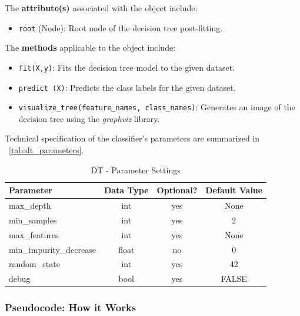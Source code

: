 \begin{appendices}
  The \textbf{attribute(s)} associated with the object include:
  \begin{itemize}
    \item \texttt{root} (Node): Root node of the decision tree post-fitting.
  \end{itemize}

  The \textbf{methods} applicable to the object include:
  \begin{itemize}
    \item \texttt{fit(X,y)}: Fits the decision tree model to the given dataset.
    \item \texttt{predict (X)}: Predicts the class labels for the given dataset.
    \item \texttt{visualize\_tree(feature\_names, class\_names)}: Generates an image of the decision tree using the \textit{graphviz} library.
  \end{itemize}

  Technical specification of the classifier's parameters are summarized in ~\autoref{tab:dt_parameters}.

  \begin{table}[H]
    \centering
    \begin{tabular}{lccc}
      \toprule
      \textbf{Parameter}      & \textbf{Data Type} & \textbf{Optional?} & \textbf{Default Value} \\
      \midrule
      max\_depth              & int                & yes                & None                   \\
      min\_samples            & int                & yes                & 2                      \\
      max\_features           & int                & yes                & None                   \\
      min\_impurity\_decrease & float              & no                 & 0                      \\
      random\_state           & int                & yes                & 42                     \\
      debug                   & bool               & yes                & FALSE                  \\
      \bottomrule
    \end{tabular}
    \caption{DT - Parameter Settings}
    \label{tab:dt_parameters}
  \end{table}

  \subsubsection{Pseudocode: How it Works}


\end{appendices}
